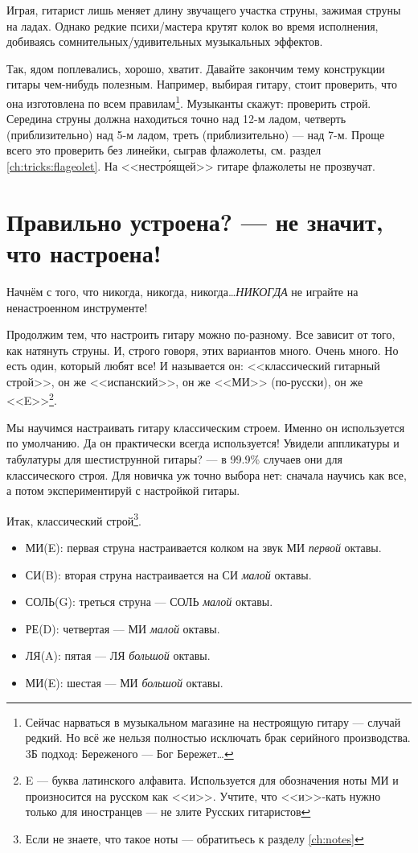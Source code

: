 Играя, гитарист лишь меняет длину звучащего участка струны, зажимая струны на ладах. Однако редкие психи/мастера крутят колок во время исполнения, добиваясь сомнительных/удивительных музыкальных эффектов.

Так, ядом поплевались, хорошо, хватит. Давайте закончим тему конструкции гитары чем-нибудь полезным. Например, выбирая гитару, стоит проверить, что она изготовлена по всем правилам\footnote{Сейчас нарваться в музыкальном магазине на нестроящую гитару --- случай редкий. Но всё же нельзя полностью исключать брак серийного производства. 3Б подход: Береженого --- Бог Бережет\ldots}. Музыканты скажут: проверить строй. Середина струны должна находиться точно над 12-м ладом, четверть (приблизительно) над 5-м ладом, треть (приблизительно) --- над 7-м. Проще всего это проверить без линейки, сыграв флажолеты, см. раздел \ref{ch:tricks:flageolet}. На <<нестр\'{о}ящей>> гитаре флажолеты не прозвучат.


\section{Правильно устроена? --- не значит, что настроена!}
\label{ch:guitar:tuning}

Начнём с того, что никогда, никогда, никогда\ldots \emph{НИКОГДА} не играйте на ненастроенном инструменте!

Продолжим тем, что настроить гитару можно по-разному. Все зависит от того, как натянуть струны. И, строго говоря, этих вариантов много. Очень много. Но есть один, который любят все! И называется он: <<классический гитарный строй>>, он же <<испанский>>, он же <<МИ>> (по-русски), он же <<E>>\footnote{E --- буква латинского алфавита. Используется для обозначения ноты МИ и произносится на русском как <<и>>. Учтите, что <<и>>-кать нужно только для иностранцев --- не злите Русских гитаристов}. 

Мы научимся настраивать гитару классическим строем. Именно он используется по умолчанию. Да он практически всегда используется! Увидели аппликатуры и табулатуры для шестиструнной гитары? --- в 99.9\% случаев они для классического строя. Для новичка уж точно выбора нет: сначала научись как все, а потом экспериментируй с настройкой гитары.

Итак, классический строй\footnote{Если не знаете, что такое ноты --- обратитьесь к разделу \ref{ch:notes}}.
\begin{itemize}
    \item МИ(E): первая струна настраивается колком на звук МИ \emph{первой} октавы.
    \item СИ(B): вторая струна настраивается на СИ \emph{малой} октавы.
    \item СОЛЬ(G): треться струна --- СОЛЬ \emph{малой} октавы.
    \item РЕ(D): четвертая --- МИ \emph{малой} октавы.
    \item ЛЯ(A): пятая --- ЛЯ \emph{большой} октавы.
    \item МИ(E): шестая --- МИ \emph{большой} октавы.
\end{itemize}

